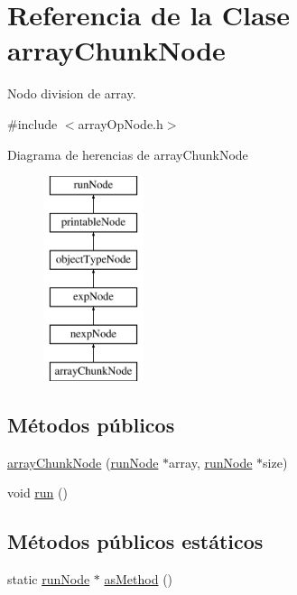 \hypertarget{classarrayChunkNode}{\section{Referencia de la Clase array\-Chunk\-Node}
\label{classarrayChunkNode}
}


Nodo division de array.  




{\ttfamily \#include $<$array\-Op\-Node.\-h$>$}

Diagrama de herencias de array\-Chunk\-Node\begin{figure}[H]
\begin{center}
\leavevmode
\includegraphics[height=6.000000cm]{classarrayChunkNode}
\end{center}
\end{figure}
\subsection*{Métodos públicos}
\begin{DoxyCompactItemize}
\item 
\hyperlink{classarrayChunkNode_a2f1eb4437b5ac66ccd8909af51fc8ec8}{array\-Chunk\-Node} (\hyperlink{classrunNode}{run\-Node} $\ast$array, \hyperlink{classrunNode}{run\-Node} $\ast$size)
\item 
void \hyperlink{classarrayChunkNode_afaeae0c90a08aa29b23ff3852a089489}{run} ()
\end{DoxyCompactItemize}
\subsection*{Métodos públicos estáticos}
\begin{DoxyCompactItemize}
\item 
static \hyperlink{classrunNode}{run\-Node} $\ast$ \hyperlink{classarrayChunkNode_a7b458328d01121dcaf5d432e37972c3a}{as\-Method} ()
\end{DoxyCompactItemize}


